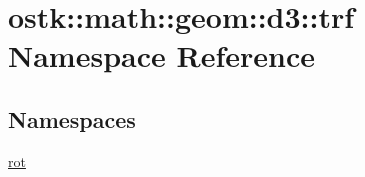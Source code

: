 \hypertarget{namespaceostk_1_1math_1_1geom_1_1d3_1_1trf}{}\section{ostk\+:\+:math\+:\+:geom\+:\+:d3\+:\+:trf Namespace Reference}
\label{namespaceostk_1_1math_1_1geom_1_1d3_1_1trf}
\subsection*{Namespaces}
\begin{DoxyCompactItemize}
\item 
 \hyperlink{namespaceostk_1_1math_1_1geom_1_1d3_1_1trf_1_1rot}{rot}
\end{DoxyCompactItemize}

